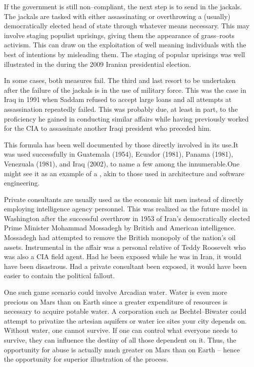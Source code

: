 If the government is still non--compliant, the next step is to send in the jackals. The jackals are tasked with either assassinating or overthrowing a (usually) democratically elected head of state through whatever means necessary. This may involve staging populist uprisings, giving them the appearance of grass--roots activism. This can draw on the exploitation of well meaning individuals with the best of intentions by misleading them. The staging of popular uprisings was well illustrated in the  during the 2009 Iranian presidential election.\footnotecite[hersh2008]\footnotecite[ross2007]

In some cases, both measures fail. The third and last resort to be undertaken after the failure of the jackals is in the use of military force. This was the case in Iraq in 1991 when Saddam refused to accept large loans and all attempts at assassination repeatedly failed. This was probably due, at least in part, to the proficiency he gained in conducting similar affairs while having previously worked for the CIA to assassinate another Iraqi president who preceded him.

This formula has been well documented by those directly involved in its use.\footnotecite[perkins2005] It was used successfully in Guatemala (1954), Ecuador (1981), Panama (1981), Venezuala (1981), and Iraq (2002), to name a few among the innumerable. One might see it as an example of a , akin to those used in architecture and software engineering.

Private consultants are usually used as the economic hit men instead of directly employing intelligence agency personnel. This was realized as the future model in Washington after the successful overthrow in 1953 of Iran's democratically elected Prime Minister Mohammad Mossadegh by British and American intelligence. Mossadegh had attempted to remove the British monopoly of the nation's oil assets. Instrumental in the affair was a personal relative of Teddy Roosevelt who was also a CIA field agent. Had he been exposed while he was in Iran, it would have been disastrous. Had a private consultant been exposed, it would have been easier to contain the political fallout.

One such game scenario could involve Arcadian water. Water is even more precious on Mars than on Earth since a greater expenditure of resources is necessary to acquire potable water. A corporation such as Bechtel--Biwater could attempt to privatize the artesian aquifers or water ice sites your city depends on. Without water, one cannot survive. If one can control what everyone needs to survive, they can influence the destiny of all those dependent on it. Thus, the opportunity for abuse is actually much greater on Mars than on Earth -- hence the opportunity for superior illustration of the process.

